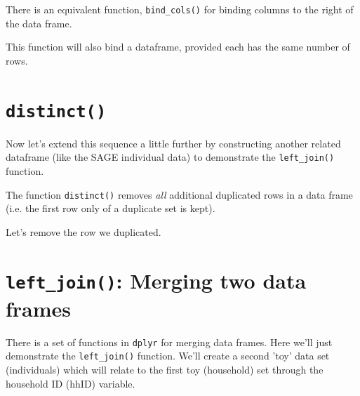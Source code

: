 \documentclass[titlepage]{book}\usepackage{knitr}
\begin{document}
There is an equivalent function, \texttt{bind\_cols()} for binding columns to the right of the data frame.

This function will also bind a dataframe, provided each has the same number of rows.
\begin{knitrout}
\color{fgcolor}\begin{kframe}
\begin{alltt}
 \hlkwb{<-} \hlstd{(hhDf,hhDf[}\hlstd{,])}  
\end{alltt}
\end{kframe}
\end{knitrout}

\section{\texttt{distinct()}} \label{dplyrDistinct}

Now let's extend this sequence a little further by constructing another related dataframe (like the SAGE individual data) to demonstrate the \texttt{left\_join()} function.

The function \texttt{distinct()} removes \textsl{all} additional duplicated rows in a data frame (i.e. the first row only of a duplicate set is kept).

Let's remove the row we duplicated.
\begin{knitrout}
\color{fgcolor}\begin{kframe}
\begin{alltt}
 \hlkwb{<-}     
\end{alltt}
\end{kframe}
\end{knitrout}


\section{\texttt{left\_join()}: Merging two data frames}\label{merging2DFs} 

There is a set of functions in \texttt{dplyr} for merging data frames. Here we'll just demonstrate the \texttt{left\_join()} function. We'll create a second 'toy' data set (individuals) which will relate to the first toy (household) set through the household ID (hhID) variable.
\end{document}
